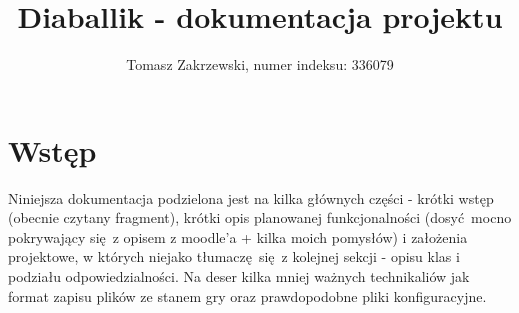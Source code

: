 \documentclass[a4paper,12pt]{article}
\title{Diaballik - dokumentacja projektu}
\author{Tomasz Zakrzewski, numer indeksu: 336079}
\begin{document}
\maketitle

\setcounter{tocdepth}{2}

\tableofcontents

\setcounter{section}{0}
\pagebreak

\section{Wstęp}
Niniejsza dokumentacja podzielona jest na kilka głównych części - krótki wstęp (obecnie czytany fragment), krótki opis planowanej funkcjonalności 
(dosyć mocno pokrywający się z opisem z moodle'a + kilka moich pomysłów) i założenia projektowe, w których niejako tłumaczę się z kolejnej sekcji -
opisu klas i podziału odpowiedzialności. Na deser kilka mniej ważnych technikaliów jak format zapisu plików ze stanem gry oraz prawdopodobne pliki
konfiguracyjne.
\end{document}
